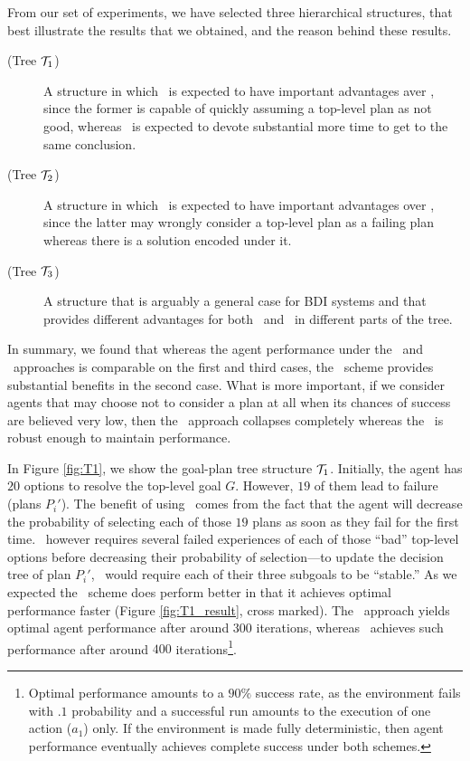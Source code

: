 From our set of experiments, we have selected three
hierarchical structures, that best illustrate the results that we
obtained, and the reason behind these results.
\begin{description}
\item[(Tree ${\mathcal{T}}_1$)] A structure in which \CL\ is expected to have
important advantages aver \BUL, since the former is capable of quickly
assuming a top-level plan as not good, whereas \BUL\ is expected to
devote substantial more time to get to the same conclusion. 

\item[(Tree ${\mathcal{T}}_2$)] A structure in which \BUL\ is expected to have
important advantages over \CL, since the latter may wrongly consider a
top-level plan as a failing plan whereas there is a solution encoded
under it. 

\item[(Tree ${\mathcal{T}}_3$)] A structure that is arguably a general case for
BDI systems and that provides different advantages for both \BUL\ and
\CL\ in different parts of the tree. 
\end{description}

In summary, we found that whereas the agent performance under the
\BUL\ and \CL\ approaches is comparable on the first and third cases,
the \BUL\ scheme provides substantial benefits in the second
case. What is more important, if we consider agents that may choose
not to consider a plan at all when its chances of success are believed
very low, then the \CL\ approach collapses completely whereas the
\BUL\ is robust enough to maintain performance.



In Figure \ref{fig:T1}, we show the goal-plan tree structure
${\mathcal{T}}_1$. Initially, the agent has $20$ options to resolve the top-level
goal $G$. However, $19$ of them lead to failure (plans
$P_i'$). The benefit of using \CL\ comes from the fact that the agent
will decrease the probability of selecting each of those $19$ plans as
soon as they fail for the first time. \BUL\  however
requires several failed experiences of each of those ``bad'' top-level
options before decreasing their probability of selection---to update
the decision tree of plan $P_i'$, \BUL\ would require each of their
three subgoals to be ``stable.''
%
As we expected the \CL\ scheme does perform
better in that it achieves optimal performance faster (Figure
\ref{fig:T1_result}, cross marked). The \CL\
approach yields optimal agent performance after around $300$
iterations, whereas \BUL\ achieves such performance after around $400$
iterations\footnote{Optimal performance amounts to a $90\%$
success rate, as the environment fails with $.1$ probability and a
successful run amounts to the execution of one action ($a_1$) only. If
the environment is made fully deterministic, then agent performance
eventually achieves complete success under both schemes.}.


